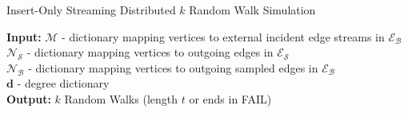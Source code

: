 \documentclass[10]{article}
\newcommand{\algoname}[1]{\textnormal{\textsc{#1}}}
\begin{document}
\begin{algorithm}[htbp] 
\caption{Insert-Only Streaming Distributed $k$ Random Walk Simulation}\label{alg:rw:distributed:insert-only:simulation:playback}
\begin{flushleft}
        \textbf{Input:} 		$\mathcal{M}$ - dictionary mapping vertices to external incident edge streams in $\mathcal{E}_\mathcal{B}$ \\
        	\hspace{3.15em}	$\mathcal{N}_\mathcal{S}$ - dictionary mapping vertices to outgoing edges in $\mathcal{E}_\mathcal{S}$ \\
        	\hspace{3.15em}	$\mathcal{N}_\mathcal{B}$ - dictionary mapping vertices to outgoing sampled edges in $\mathcal{E}_\mathcal{B}$ \\
        	\hspace{3.15em}	$\mathbf{d}$ - degree dictionary \\
        \textbf{Output:} $k$ Random Walks (length $t$ or ends in FAIL)

\end{flushleft}
\end{algorithm}
\end{document}
